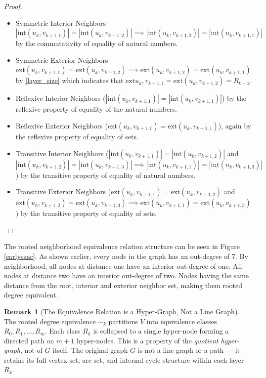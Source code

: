 \documentclass[AMS, Times1COL]{article} %
\theoremstyle{definition}
\newtheorem{remark}{Remark}[section]
\begin{document}
\begin{proof}
		\begin{itemize}
			\item Symmetric Interior Neighbors $|\text{int}(u_k, v_{k+1, 1})|=|\text{int}(u_k, v_{k+1, 2})| \implies  |\text{int}(u_k, v_{k+1, 2})|=|\text{int}(u_k, v_{k+1, 1})|$ by the commutativity of equality of natural numbers. 
			\item Symmetric Exterior Neighbors$\text{ext}(u_k, v_{k+1, 1})=\text{ext}(u_k, v_{k+1, 2}) \implies  \text{ext}(u_k, v_{k+1, 2})=\text{ext}(u_k, v_{k+1, 1})$ by \ref{layer_size} which indicates that $\text{ext}{u_k, v_{k+1, 1}} = \text{ext}(u_k, v_{k+1, 2}) = R_{k+2}$. 
			\item Reflexive Interior Neighbors ($|\text{int}(u_k, v_{k+1, 1})|=|\text{int}(u_k, v_{k+1, 1})|$) by the reflexive property of equality of the natural numbers. 
			\item Reflexive Exterior Neighbors ($\text{ext}(u_k, v_{k+1, 1}) = \text{ext}(u_k, v_{k+1, 1})$), again by the reflexive property of equality of sets. 
			\item Transitive Interior Neighbors ($|\text{int}(u_k, v_{k+1, 1})|=|\text{int}(u_k, v_{k+1, 2})|$ and $|\text{int}(u_k, v_{k+1, 2})|=|\text{int}(u_k, v_{k+1, 3})| \implies |\text{int}(u_k, v_{k+1, 1})|=|\text{int}(u_k, v_{k+1, 3})|$) by the transitive property of equality of natural numbers. 
			\item Transitive Exterior Neighbors ($\text{ext}(u_k, v_{k+1, 1})=\text{ext}(u_k, v_{k+1, 2})$ and $\text{ext}(u_k, v_{k+1, 2})=\text{ext}(u_k, v_{k+1, 3}) \implies \text{ext}(u_k, v_{k+1, 1})=\text{ext}(u_k, v_{k+1, 3})$) by the transitive property of equality of sets. 
		\end{itemize}
		
		
	\end{proof}
	
	The rooted neighborhood equivalence relation structure can be seen in Figure \ref{earlyssnc}. As shown earlier, every node in the graph has an out-degree of 7. By neighborhood, all nodes at distance one have an interior out-degree of one. All nodes at distance two have an interior out-degree of two. Nodes having the same distance from the root, interior and exterior neighbor set, making them rooted degree equivalent.
	
	\begin{remark}[The Equivalence Relation is a Hyper-Graph, Not a Line Graph]
		The rooted degree equivalence $\sim_k$ partitions $V$ into equivalence classes $R_0, R_1, \ldots, R_m$. Each class $R_k$ is collapsed to a single hyper-node forming a directed path on $m+1$ hyper-nodes. This is a property of the \emph{quotient hyper-graph}, not of $G$ itself. 
		The original graph $G$ is not a line graph or a path --- it retains its full vertex set, arc set, and internal cycle structure within each layer $R_k$.
	\end{remark}
	
\end{document}
